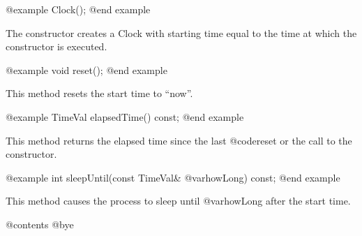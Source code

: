 @example
Clock();
@end example

The constructor creates a Clock with starting time equal to the
time at which the constructor is executed.

@example
void reset();
@end example

This method resets the start time to ``now''.

@example
TimeVal elapsedTime() const;
@end example

This method returns the elapsed time since the last @code{reset} or
the call to the constructor.

@example
int sleepUntil(const TimeVal& @var{howLong}) const;
@end example

This method causes the process to sleep until @var{howLong} after the
start time.

@contents
@bye
